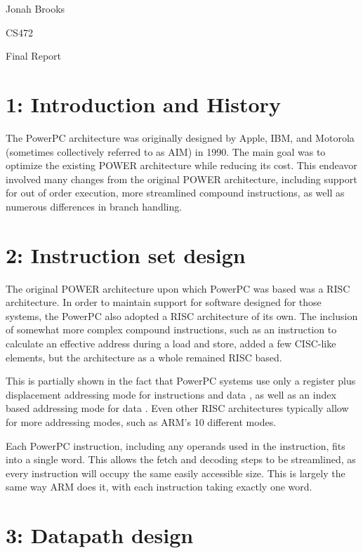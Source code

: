 \documentclass{article}
\begin{document}
\begin{flushright}
Jonah Brooks

CS472

Final Report
\end{flushright}

\section*{1: Introduction and History}

The PowerPC architecture was originally designed by Apple, IBM, and Motorola
(sometimes collectively referred to as AIM) in 1990. The main goal was to
optimize the existing POWER architecture while reducing its cost. This
endeavor involved many changes from the original POWER architecture, including
support for out of order execution, more streamlined compound instructions, as
well as numerous differences in branch handling. \cite{1}

\section*{2: Instruction set design}

The original POWER architecture upon which PowerPC was based was a RISC
architecture. In order to maintain support for software designed for those
systems, the PowerPC also adopted a RISC architecture of its own. The
inclusion of somewhat more complex compound instructions, such as an
instruction to calculate an effective address during a load and store, added a
few CISC-like elements, but the architecture as a whole remained RISC based.
\cite{1}

This is partially shown in the fact that PowerPC systems use only a register
plus displacement addressing mode for instructions and data \cite{2}, as well as
an index based addressing mode for data \cite{4}. 
Even other RISC architectures typically allow for more addressing modes, such as ARM's 10 different modes. \cite{3}

Each PowerPC instruction, including any operands used in the instruction, fits
into a single word. This allows the fetch and decoding steps to be
streamlined, as every instruction will occupy the same easily accessible size.
\cite{5} This is largely the same way ARM does it, with each instruction taking
exactly one word. \cite{3}


\section*{3: Datapath design}
\end{document}
